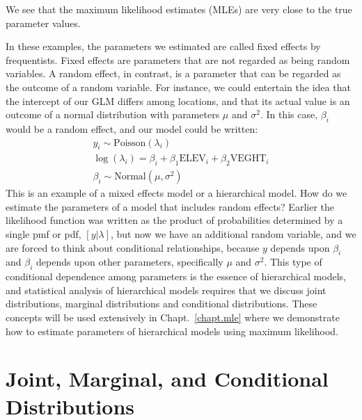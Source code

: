 We see that the maximum likelihood estimates (MLEs) are very close to
the true parameter values.

In these examples, the parameters we estimated are called fixed
effects by frequentists. Fixed effects are parameters that are not
regarded as being random variables. A random effect, in
contrast, is a parameter that can be regarded as the outcome of
a random variable. For instance,
we could entertain the idea that the intercept of our GLM differs
among locations, and that its actual value is an outcome of a normal
distribution with parameters $\mu$ and $\sigma^2$. In this case,
$\beta_i$ would be a random effect, and our model could be written:
\begin{gather*}
y_i \sim \text{Poisson}(\lambda_i) \\
\log(\lambda_i) = \beta_i + \beta_1\text{ELEV}_i + \beta_2\text{VEGHT}_i \\
\beta_i \sim \text{Normal}(\mu, \sigma^2)
\end{gather*}
This is an example of a mixed effects model or a hierarchical
model. How do we estimate the parameters of a model that includes
random effects? Earlier the likelihood function was written as the
product of probabilities determined by a single pmf or pdf,
$[y|\lambda]$, but now we have an additional random variable, and we
are forced to think about conditional relationships, because $y$
depends upon $\beta_i$ and $\beta_i$ depends upon other parameters,
specifically $\mu$ and $\sigma^2$.
This type of conditional dependence among parameters is the essence of hierarchical
models, and statistical analysis of hierarchical models requires that
we discuss joint distributions, marginal distributions and conditional
distributions. These concepts will be used extensively in
Chapt.~\ref{chapt.mle} where we demonstrate how to estimate parameters
of hierarchical models using maximum likelihood.


\section{Joint, Marginal, and Conditional Distributions}

